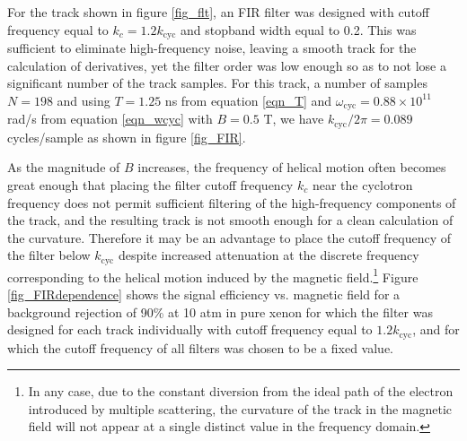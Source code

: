 \documentclass{JINST}
\begin{document}
For the track shown in figure \ref{fig_flt}, an FIR filter was designed with 
cutoff frequency equal to $k_c = 1.2k_{\mathrm{cyc}}$ and stopband width equal to 0.2.  This was sufficient to 
eliminate high-frequency noise, leaving a smooth track for the calculation of derivatives, yet the filter order was
low enough so as to not lose a significant number of the track samples.  For this track, a number of samples 
$N = 198$ and using $T = 1.25$ ns from equation \ref{eqn_T} and $\omega_{\mathrm{cyc}} = 0.88 \times 
10^{11}$ rad/s from equation \ref{eqn_wcyc} with $B = 0.5$ T, we have $k_{\mathrm{cyc}}/2\pi = 0.089$ 
cycles/sample as shown in figure \ref{fig_FIR}.

As the magnitude of $B$ increases, the frequency of helical motion often becomes great enough that placing the 
filter cutoff frequency $k_{c}$ near the cyclotron frequency does not permit sufficient filtering of the 
high-frequency components of the track, and the resulting track is not smooth enough for a clean calculation of 
the curvature.  Therefore it may be an advantage to place the cutoff frequency of the filter below 
$k_{\mathrm{cyc}}$ despite increased attenuation at the discrete frequency corresponding to the helical motion 
induced by the magnetic field.\footnote{In any case, due to the constant diversion from the ideal path of the electron
introduced by multiple scattering, the curvature of the track in the magnetic field will not appear at a single 
distinct value in the frequency domain.}  Figure \ref{fig_FIRdependence} shows the signal efficiency vs. magnetic
field for a background rejection of 90\% at 10 atm in pure xenon for which the filter was designed for each track 
individually with cutoff frequency equal to $1.2k_{\mathrm{cyc}}$, and for which the cutoff frequency of all filters 
was chosen to be a fixed value.
\end{document}
